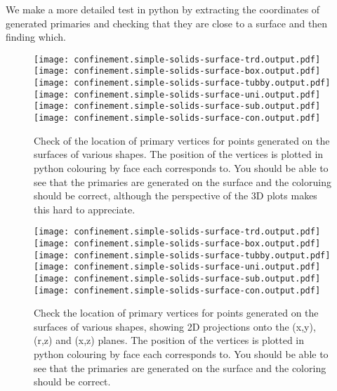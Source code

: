 We make a more detailed test in python by extracting the coordinates of generated primaries and checking that they are close to a surface and then finding which.


\begin{figure}[h!]
    \centering
    \texttt{[image: confinement.simple-solids-surface-trd.output.pdf]}
    \texttt{[image: confinement.simple-solids-surface-box.output.pdf]}
    \texttt{[image: confinement.simple-solids-surface-tubby.output.pdf]}
    \texttt{[image: confinement.simple-solids-surface-uni.output.pdf]}
    \texttt{[image: confinement.simple-solids-surface-sub.output.pdf]}
    \texttt{[image: confinement.simple-solids-surface-con.output.pdf]}
    \caption{Check of the location of primary vertices for points generated on the surfaces of various shapes. The position of the vertices is plotted in python colouring by face each corresponds to.
    You should be able to see that the primaries are generated on the surface and the coloruing should be correct, although the perspective of the 3D plots makes this hard to appreciate.
        }
\end{figure}


\begin{figure}[h!]
    \centering
    \texttt{[image: confinement.simple-solids-surface-trd.output.pdf]}
    \texttt{[image: confinement.simple-solids-surface-box.output.pdf]}
    \texttt{[image: confinement.simple-solids-surface-tubby.output.pdf]}
    \texttt{[image: confinement.simple-solids-surface-uni.output.pdf]}
    \texttt{[image: confinement.simple-solids-surface-sub.output.pdf]}
    \texttt{[image: confinement.simple-solids-surface-con.output.pdf]}

    \caption{Check the location of primary vertices for points generated on the surfaces of various shapes, showing 2D projections onto the (x,y), (r,z) and (x,z) planes. The position of the vertices is plotted in python colouring by face each corresponds to.
    You should be able to see that the primaries are generated on the surface and the coloring should be correct.
        }
\end{figure}



